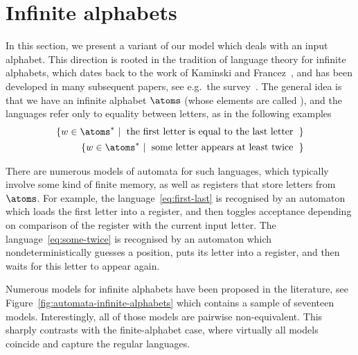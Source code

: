 \section{Infinite alphabets}
\label{sec:infinite-alphabets}
\AP
In this section, we present a variant of our model which deals with an input
alphabet. This direction is rooted in the tradition of language theory for
infinite alphabets, which dates back to the work of Kaminski and
Francez~\cite{kaminskiFiniteMemoryAutomata1994}, and has been developed in many
subsequent papers, see e.g.~the
survey~\cite{bojanczykOrbitFiniteSetsTheir2017}. The general idea is that we
have an infinite alphabet $\atoms$ (whose elements are called ), and the
languages  refer only to equality between letters, as in the following examples
\begin{align}
\setbuild{ w \in \atoms^*}{the first letter is equal to the last letter}
\label{eq:first-last}
\\
\setbuild{ w \in \atoms^*}{some letter appears at least twice}
\label{eq:some-twice}
\end{align}

There are numerous models of automata for such languages, which typically
involve some kind of finite memory, as well as registers that store letters
from $\atoms$. For example, the language~\eqref{eq:first-last} is recognised by
an automaton which loads the first letter into a register, and then toggles
acceptance depending on comparison of the register with the current input
letter. The language~\eqref{eq:some-twice} is recognised by an automaton which
nondeterministically guesses a position, puts its letter into a register, and
then waits for this letter to appear again. 

Numerous models for infinite alphabets have been proposed in the literature,
see Figure~\ref{fig:automata-infinite-alphabets} which contains a sample of
seventeen models. Interestingly, all of those models are pairwise
non-equivalent. This sharply contrasts with the finite-alphabet case, where
virtually all models coincide and capture the regular languages. 

